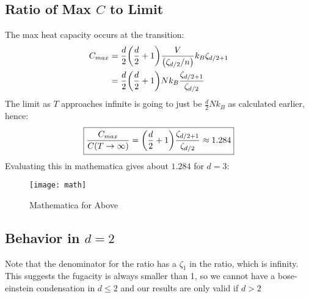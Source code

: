 \documentclass[12pt]{article}
\begin{document}
\subsection{Ratio of Max $C$ to Limit}
The max heat capacity occurs at the transition:
\begin{align*}
  C_{max}&=\frac{d}{2}\qty(\frac{d}{2}+1)\frac{V}{\qty(\zeta_{d/2}/n)}k_B
  \zeta_{d/2+1}\\
  &=\frac{d}{2}\qty(\frac{d}{2}+1)Nk_B\frac{\zeta_{d/2+1}}{\zeta_{d/2}}
\end{align*}
The limit as $T$ approaches infinite is going to just be $\frac{d}{2}Nk_B$ as calculated earlier, hence:
\begin{align}
  \boxed{\frac{C_{max}}{C(T\to\infty)}=\qty(\frac{d}{2}+1)
  \frac{\zeta_{d/2+1}}{\zeta_{d/2}}\approx1.284}
\end{align}
Evaluating this in mathematica gives about $1.284$ for $d=3$:
\begin{figure}[H]
  \centering
  \texttt{[image: math]}
  \caption{Mathematica for Above}
\end{figure}

\subsection{Behavior in $d=2$}
Note that the denominator for the ratio has a $\zeta_1$ in the ratio, which is infinity. This suggests the fugacity is always smaller than 1, so we cannot have a bose-einstein condensation in $d\leq 2$ and our results are only valid if $d>2$
\end{document}
